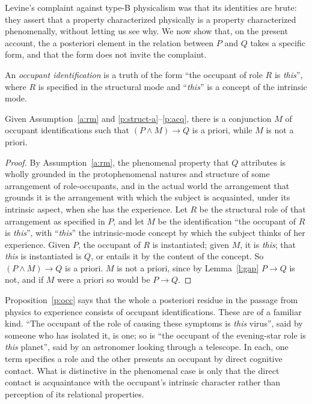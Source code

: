 \documentclass{situationist-preprint}
\begin{document}
Levine's complaint against type-B physicalism was that its identities are brute: they assert that a property characterized physically is a property characterized phenomenally, without letting us see why. We now show that, on the present account, the a posteriori element in the relation between $P$ and $Q$ takes a specific form, and that the form does not invite the complaint.

\begin{definition}\label{d:occ}
An \emph{occupant identification} is a truth of the form \enquote{the occupant of role $R$ is \emph{this}}, where $R$ is specified in the structural mode and \enquote{\emph{this}} is a concept of the intrinsic mode.
\end{definition}

\begin{proposition}\label{p:occ}
Given Assumption~\ref{a:rm} and \ref{p:struct-a}--\ref{p:acq}, there is a conjunction $M$ of occupant identifications such that $(P \wedge M) \to Q$ is a priori, while $M$ is not a priori.
\end{proposition}

\begin{proof}
By Assumption~\ref{a:rm}, the phenomenal property that $Q$ attributes is wholly grounded in the protophenomenal natures and structure of some arrangement of role-occupants, and in the actual world the arrangement that grounds it is the arrangement with which the subject is acquainted, under its intrinsic aspect, when she has the experience. Let $R$ be the structural role of that arrangement as specified in $P$, and let $M$ be the identification \enquote{the occupant of $R$ is \emph{this}}, with \enquote{\emph{this}} the intrinsic-mode concept by which the subject thinks of her experience. Given $P$, the occupant of $R$ is instantiated; given $M$, it is \emph{this}; that \emph{this} is instantiated is $Q$, or entails it by the content of the concept. So $(P \wedge M) \to Q$ is a priori. $M$ is not a priori, since by Lemma~\ref{l:gap} $P \to Q$ is not, and if $M$ were a priori so would be $P \to Q$.
\end{proof}

Proposition~\ref{p:occ} says that the whole a posteriori residue in the passage from physics to experience consists of occupant identifications. These are of a familiar kind. \enquote{The occupant of the role of causing these symptoms is \emph{this} virus}, said by someone who has isolated it, is one; so is \enquote{the occupant of the evening-star role is \emph{this} planet}, said by an astronomer looking through a telescope. In each, one term specifies a role and the other presents an occupant by direct cognitive contact. What is distinctive in the phenomenal case is only that the direct contact is acquaintance with the occupant's intrinsic character rather than perception of its relational properties.
\end{document}
